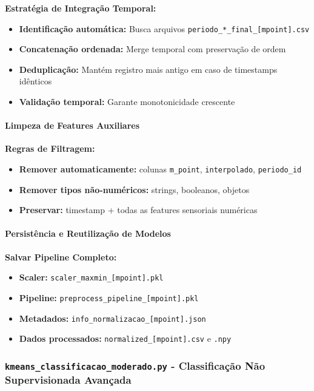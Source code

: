 \textbf{Estratégia de Integração Temporal:}
\begin{itemize}
    \item \textbf{Identificação automática:} Busca arquivos \texttt{periodo\_*\_final\_[mpoint].csv}
    \item \textbf{Concatenação ordenada:} Merge temporal com preservação de ordem
    \item \textbf{Deduplicação:} Mantém registro mais antigo em caso de timestamps idênticos
    \item \textbf{Validação temporal:} Garante monotonicidade crescente
\end{itemize}

\paragraph{Limpeza de Features Auxiliares}

\textbf{Regras de Filtragem:}
\begin{itemize}
    \item \textbf{Remover automaticamente:} colunas \texttt{m\_point}, \texttt{interpolado}, \texttt{periodo\_id}
    \item \textbf{Remover tipos não-numéricos:} strings, booleanos, objetos
    \item \textbf{Preservar:} timestamp + todas as features sensoriais numéricas
\end{itemize}

\paragraph{Persistência e Reutilização de Modelos}

\textbf{Salvar Pipeline Completo:}
\begin{itemize}
    \item \textbf{Scaler:} \texttt{scaler\_maxmin\_[mpoint].pkl}
    \item \textbf{Pipeline:} \texttt{preprocess\_pipeline\_[mpoint].pkl}
    \item \textbf{Metadados:} \texttt{info\_normalizacao\_[mpoint].json}
    \item \textbf{Dados processados:} \texttt{normalized\_[mpoint].csv} e \texttt{.npy}
\end{itemize}

\subsubsection{\texttt{kmeans\_classificacao\_moderado.py} - Classificação Não Supervisionada Avançada}

